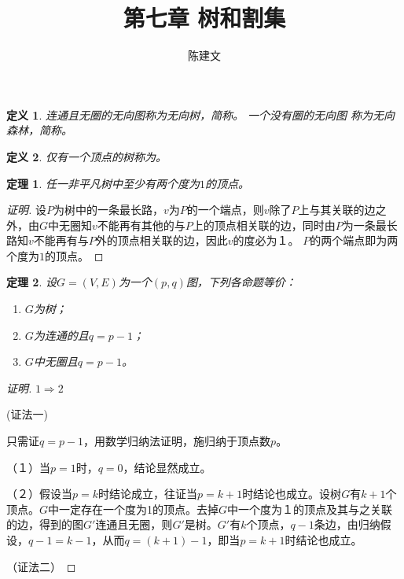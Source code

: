 \documentclass{article}
\newtheorem{Def}{定义}
\newtheorem{Thm}{定理}
\begin{document}
\begin{CJK*}{UTF8}{gbsn}
  \title{第七章 树和割集}
  \author{陈建文}
  \maketitle
  
  \begin{Def}
    连通且无圈的无向图称为无向树，简称{}。 一个没有圈的无向图
    称为无向森林，简称{}。
  \end{Def}

  \begin{Def}
    仅有一个顶点的树称为{}。
  \end{Def}
  \begin{Thm}
    任一非平凡树中至少有两个度为$1$的顶点。
  \end{Thm}
  \begin{proof}[证明]
    设$P$为树中的一条最长路，$v$为$P$的一个端点，则$v$除了$P$上与其关联的边之外，由$G$中无圈知$v$不能再有其他的与$P$上的顶点相关联的边，同时由$P$为一条最长路知$v$不能再有与$P$外的顶点相关联的边，因此$v$的度必为１。
    $P$的两个端点即为两个度为$1$的顶点。
  \end{proof}
  \begin{Thm}
  设$G=(V,E)$为一个$(p,q)$图，下列各命题等价：
  \begin{enumerate}
  \item $G$为树；
  \item $G$为连通的且$q = p - 1$；
  \item $G$中无圈且$q = p - 1$。
  \end{enumerate}
\end{Thm}
\begin{proof}[证明]  \mbox{}\par{}

  $1\Rightarrow2$

  (证法一)
  
    只需证$q=p-1$，用数学归纳法证明，施归纳于顶点数$p$。
    
    （１）当$p=1$时，$q=0$，结论显然成立。

    （２）假设当$p=k$时结论成立，往证当$p=k+1$时结论也成立。设树$G$有$k+1$个顶点。$G$中一定存在一个度为1的顶点。去掉$G$中一个度为１的顶点及其与之关联的边，得到的图$G'$连通且无圈，则$G'$是树。$G'$有$k$个顶点，$q-1$条边，由归纳假设，$q-1 = k - 1$，从而$q = (k +1) - 1$，即当$p=k+1$时结论也成立。

    （证法二）
    

\end{proof}
\end{CJK*}
\end{document}
